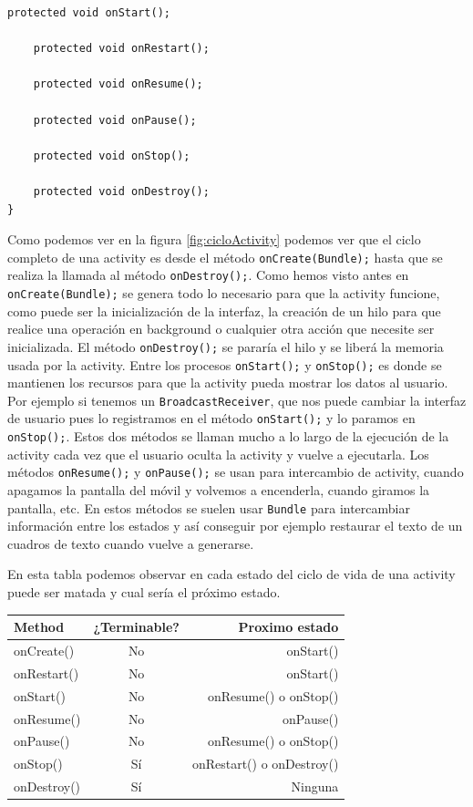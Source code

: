 \begin{itemize}
\begin{lstlisting}[style=Java]
	protected void onStart();

	protected void onRestart();

	protected void onResume();

	protected void onPause();

	protected void onStop();

	protected void onDestroy();
}
\end{lstlisting}

Como podemos ver en la figura \ref{fig:cicloActivity} podemos ver que el ciclo completo de una activity es desde el método \lstinline{onCreate(Bundle);} hasta que se realiza la llamada al método \lstinline{onDestroy();}. Como hemos visto antes en \lstinline{onCreate(Bundle);} se genera todo lo necesario para que la activity funcione, como puede ser la inicialización de la interfaz, la creación de un hilo para que realice una operación en background o cualquier otra acción que necesite ser inicializada. El método \lstinline{onDestroy();} se pararía el hilo y se liberá la memoria usada por la activity. Entre los procesos \lstinline{onStart();} y \lstinline{onStop();} es donde se mantienen los recursos para que la activity pueda mostrar los datos al usuario. Por ejemplo si tenemos un \lstinline{BroadcastReceiver}, que nos puede cambiar la interfaz de usuario pues lo registramos en el método \lstinline{onStart();} y lo paramos en \lstinline{onStop();}. Estos dos métodos se llaman mucho a lo largo de la ejecución de la activity cada vez que el usuario oculta la activity y vuelve a ejecutarla. Los métodos \lstinline{onResume();} y \lstinline{onPause();} se usan para intercambio de activity, cuando apagamos la pantalla del móvil y volvemos a encenderla, cuando giramos la pantalla, etc. En estos métodos se suelen usar \lstinline{Bundle} para intercambiar información entre los estados y así conseguir por ejemplo restaurar el texto de un cuadros de texto cuando vuelve a generarse.

En esta tabla podemos observar en cada estado del ciclo de vida de una activity puede ser matada y cual sería el próximo estado.
\begin{center}
\begin{tabular}{|l | c | r|}

\hline
Method & ¿Terminable? & Proximo estado\\
\hline
onCreate() & No & onStart()\\
\hline
onRestart() & No & onStart()\\
\hline
onStart() & No & onResume() o onStop()\\
\hline
onResume() & No & onPause()\\
\hline
onPause() & No  & onResume() o onStop()\\
\hline
onStop() & Sí & onRestart() o onDestroy()\\
\hline
onDestroy() & Sí & Ninguna\\
\hline


\end{tabular}
\end{center}
\end{itemize}
